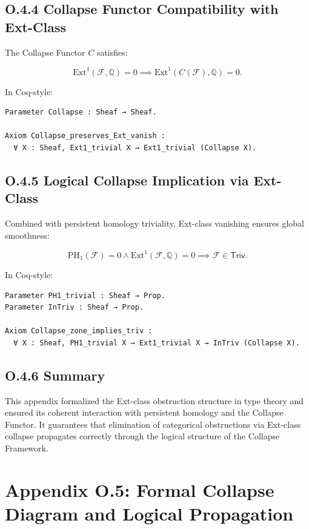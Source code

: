 \documentclass[11pt]{article}
\begin{document}
\subsection*{O.4.4 Collapse Functor Compatibility with Ext-Class}

The Collapse Functor \( C \) satisfies:

\[
\mathrm{Ext}^1(\mathcal{F}, \mathbb{Q}) = 0 \implies \mathrm{Ext}^1(C(\mathcal{F}), \mathbb{Q}) = 0.
\]

In Coq-style:

\begin{lstlisting}[language=Coq]
Parameter Collapse : Sheaf → Sheaf.

Axiom Collapse_preserves_Ext_vanish :
  ∀ X : Sheaf, Ext1_trivial X → Ext1_trivial (Collapse X).
\end{lstlisting}

\subsection*{O.4.5 Logical Collapse Implication via Ext-Class}

Combined with persistent homology triviality, Ext-class vanishing ensures global smoothness:

\[
\mathrm{PH}_1(\mathcal{F}) = 0 \land \mathrm{Ext}^1(\mathcal{F}, \mathbb{Q}) = 0 \implies \mathcal{F} \in \mathsf{Triv}.
\]

In Coq-style:

\begin{lstlisting}[language=Coq]
Parameter PH1_trivial : Sheaf → Prop.
Parameter InTriv : Sheaf → Prop.

Axiom Collapse_zone_implies_triv :
  ∀ X : Sheaf, PH1_trivial X → Ext1_trivial X → InTriv (Collapse X).
\end{lstlisting}

\subsection*{O.4.6 Summary}

This appendix formalized the Ext-class obstruction structure in type theory and ensured its coherent interaction with persistent homology and the Collapse Functor.  
It guarantees that elimination of categorical obstructions via Ext-class collapse propagates correctly through the logical structure of the Collapse Framework.



\section*{Appendix O.5: Formal Collapse Diagram and Logical Propagation}
\end{document}
